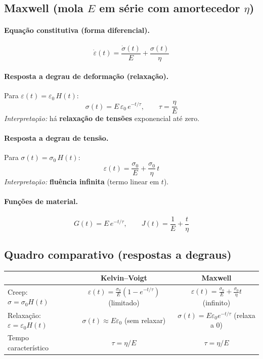 
\subsection{Maxwell (mola $E$ em série com amortecedor $\eta$)}
\paragraph{Equação constitutiva (forma diferencial).}
\[
\dot{\varepsilon}(t)=\frac{\dot{\sigma}(t)}{E}+\frac{\sigma(t)}{\eta}
\]

\paragraph{Resposta a degrau de deformação (relaxação).}
Para $\varepsilon(t)=\varepsilon_0\,H(t)$:
\[
\sigma(t)= E\,\varepsilon_0\,e^{-t/\tau},
\qquad \tau=\frac{\eta}{E}
\]
\emph{Interpretação:} há \textbf{relaxação de tensões} exponencial até zero.

\paragraph{Resposta a degrau de tensão.}
Para $\sigma(t)=\sigma_0\,H(t)$:
\[
\varepsilon(t)=\frac{\sigma_0}{E}+\frac{\sigma_0}{\eta}\,t
\]
\emph{Interpretação:} \textbf{fluência infinita} (termo linear em $t$).

\paragraph{Funções de material.}
\[
G(t)=E\,e^{-t/\tau}, \qquad
J(t)=\frac{1}{E}+\frac{t}{\eta}
\]

\subsection{Quadro comparativo (respostas a degraus)}
\begin{center}
\renewcommand{\arraystretch}{1.25}
\begin{tabular}{|l|c|c|}
\hline
 & \textbf{Kelvin--Voigt} & \textbf{Maxwell} \\
\hline
Creep: $\sigma=\sigma_0 H(t)$ &
$\displaystyle \varepsilon(t)=\frac{\sigma_0}{E}\!\left(1-e^{-t/\tau}\right)$ (limitado) &
$\displaystyle \varepsilon(t)=\frac{\sigma_0}{E}+\frac{\sigma_0}{\eta}t$ (infinito) \\
\hline
Relaxação: $\varepsilon=\varepsilon_0 H(t)$ &
$\sigma(t)\approx E\varepsilon_0$ (sem relaxar) &
$\displaystyle \sigma(t)=E\varepsilon_0 e^{-t/\tau}$ (relaxa a 0) \\
\hline
Tempo característico &
$\tau=\eta/E$ &
$\tau=\eta/E$ \\
\hline
\end{tabular}
\end{center}

